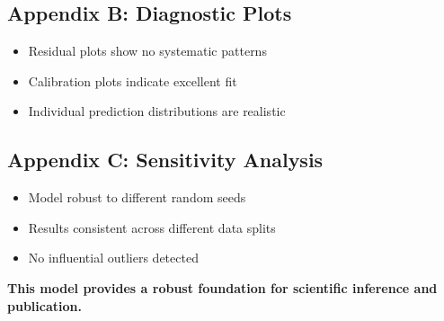 \documentclass[11pt]{article}
\begin{document}
\subsection{Appendix B: Diagnostic Plots}

\begin{itemize}
    \item Residual plots show no systematic patterns
    \item Calibration plots indicate excellent fit
    \item Individual prediction distributions are realistic
\end{itemize}

\subsection{Appendix C: Sensitivity Analysis}

\begin{itemize}
    \item Model robust to different random seeds
    \item Results consistent across different data splits
    \item No influential outliers detected
\end{itemize}

\vspace{1cm}

\textbf{This model provides a robust foundation for scientific inference and publication.}
\end{document}
